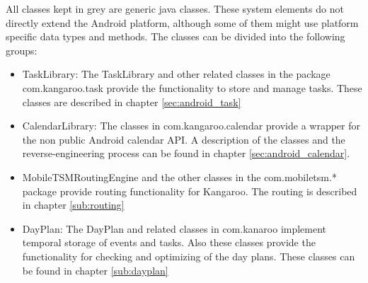 All classes kept in grey are generic java classes. These system elements do not directly extend the Android platform, although some of them might use platform specific data types and methods. The classes can be divided into the following groups:
\begin{itemize}
\item TaskLibrary: The TaskLibrary and other related classes in the package com.kangaroo.task provide the functionality to store and manage tasks. These classes are described in chapter \ref{sec:android_task} 
\item CalendarLibrary: The classes in com.kangaroo.calendar provide a wrapper for the non public Android calendar API. A description of the classes and the reverse-engineering process can be found in chapter \ref{sec:android_calendar}.
\item MobileTSMRoutingEngine and the other classes in the com.mobiletsm.* package provide routing functionality for Kangaroo. The routing is described in chapter \ref{sub:routing}
\item DayPlan: The DayPlan and related classes in com.kanaroo implement temporal storage of events and tasks. Also these classes provide the functionality for checking and optimizing of the day plans. These classes can be found in chapter \ref{sub:dayplan} 
\end{itemize}
